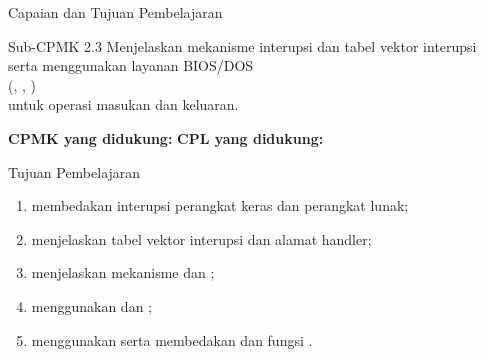 \documentclass[aspectratio=169,11pt]{beamer}
\begin{document}

\begin{frame}{Capaian dan Tujuan Pembelajaran}
\begin{block}{Sub-CPMK 2.3}
\footnotesize
Menjelaskan mekanisme interupsi dan tabel vektor interupsi\\
serta menggunakan layanan BIOS/DOS\\
(, , )\\
untuk operasi masukan dan keluaran.
\end{block}

\vspace{0.1em}
{\footnotesize\textbf{CPMK yang didukung:} \quad\textbullet\quad
\textbf{CPL yang didukung:} \par}

\vspace{0.15em}
\begin{exampleblock}{Tujuan Pembelajaran}
\footnotesize
\begin{enumerate}
    \item membedakan interupsi perangkat keras dan perangkat lunak;
    \item menjelaskan tabel vektor interupsi dan alamat handler;
    \item menjelaskan mekanisme  dan ;
    \item menggunakan  dan ;
    \item menggunakan  serta membedakan
           dan fungsi .
\end{enumerate}
\end{exampleblock}
\end{frame}
\end{document}
